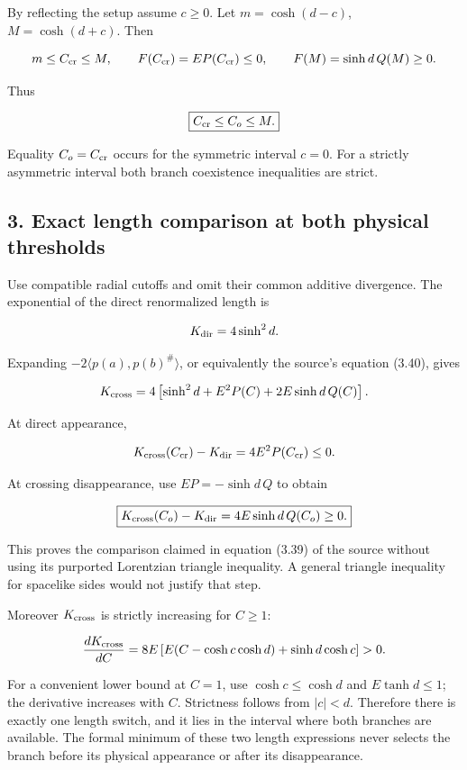 \documentclass[11pt]{article}
\begin{document}
By reflecting the setup assume \(c\ge0\). Let \(m=\cosh(d-c)\),
\(M=\cosh(d+c)\). Then

\[
 m\le C_{\rm cr}\le M,
 \qquad F(C_{\rm cr})=E P(C_{\rm cr})\le0,
 \qquad F(M)=\sinh d\,Q(M)\ge0.
\]

Thus

\[
 \boxed{C_{\rm cr}\le C_o\le M.}
\]

Equality \(C_o=C_{\rm cr}\) occurs for the symmetric interval \(c=0\).
For a strictly asymmetric interval both branch coexistence inequalities
are strict.

\subsection{3. Exact length comparison at both physical
thresholds}\label{exact-length-comparison-at-both-physical-thresholds}

Use compatible radial cutoffs and omit their common additive divergence.
The exponential of the direct renormalized length is

\[
 K_{\rm dir}=4\sinh^2d.
\]

Expanding \(-2\langle p(a),p(b)^\#\rangle\), or equivalently the
source's equation (3.40), gives

\[
 K_{\rm cross}
 =4\left[\sinh^2d+E^2P(C)+2E\sinh d\,Q(C)\right].
\]

At direct appearance,

\[
 K_{\rm cross}(C_{\rm cr})-K_{\rm dir}
 =4E^2P(C_{\rm cr})\le0.
\]

At crossing disappearance, use \(EP=-\sinh d\,Q\) to obtain

\[
 \boxed{K_{\rm cross}(C_o)-K_{\rm dir}
 =4E\sinh d\,Q(C_o)\ge0.}
\]

This proves the comparison claimed in equation (3.39) of the source
without using its purported Lorentzian triangle inequality. A general
triangle inequality for spacelike sides would not justify that step.

Moreover \(K_{\rm cross}\) is strictly increasing for \(C\ge1\):

\[
 \frac{dK_{\rm cross}}{dC}
 =8E\left[E(C-\cosh c\cosh d)+\sinh d\cosh c\right]>0.
\]

For a convenient lower bound at \(C=1\), use \(\cosh c\le\cosh d\) and
\(E\tanh d\le1\); the derivative increases with \(C\). Strictness
follows from \(|c|<d\). Therefore there is exactly one length switch,
and it lies in the interval where both branches are available. The
formal minimum of these two length expressions never selects the branch
before its physical appearance or after its disappearance.
\end{document}

